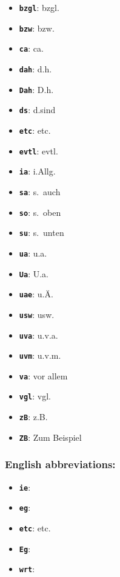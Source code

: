 \documentclass[english]{hgbarticle}
\begin{document}
\begin{itemize}
    \item \textbf{\texttt{{\bs}bzgl}}: bzgl.
    \item \textbf{\texttt{{\bs}bzw}}: bzw.
    \item \textbf{\texttt{{\bs}ca}}: ca.
    \item \textbf{\texttt{{\bs}dah}}: d.\thinspace{}h.
    \item \textbf{\texttt{{\bs}Dah}}: D.\thinspace{}h.
    \item \textbf{\texttt{{\bs}ds}}: d.\thinspace{}sind
    \item \textbf{\texttt{{\bs}etc}}: etc.
    \item \textbf{\texttt{{\bs}evtl}}: evtl.
    \item \textbf{\texttt{{\bs}ia}}: i.\thinspace{}Allg.
    \item \textbf{\texttt{{\bs}sa}}: s.\ auch
    \item \textbf{\texttt{{\bs}so}}: s.\ oben
    \item \textbf{\texttt{{\bs}su}}: s.\ unten
    \item \textbf{\texttt{{\bs}ua}}: u.\thinspace{}a.
    \item \textbf{\texttt{{\bs}Ua}}: U.\thinspace{}a.
    \item \textbf{\texttt{{\bs}uae}}: u.\thinspace{}\"A.
    \item \textbf{\texttt{{\bs}usw}}: usw.
    \item \textbf{\texttt{{\bs}uva}}: u.\thinspace{}v.\thinspace{}a.
    \item \textbf{\texttt{{\bs}uvm}}: u.\thinspace{}v.\thinspace{}m.
    \item \textbf{\texttt{{\bs}va}}: vor allem
    \item \textbf{\texttt{{\bs}vgl}}: vgl.
    \item \textbf{\texttt{{\bs}zB}}: z.\thinspace{}B.
    \item \textbf{\texttt{{\bs}ZB}}: Zum Beispiel
\end{itemize}

\subsubsection*{English abbreviations:}

\begin{itemize}
    \item \textbf{\texttt{{\bs}ie}}: \ie
    \item \textbf{\texttt{{\bs}eg}}: \eg
    \item \textbf{\texttt{{\bs}etc}}: etc.
    \item \textbf{\texttt{{\bs}Eg}}: \Eg
    \item \textbf{\texttt{{\bs}wrt}}: \wrt
\end{itemize}
\end{document}

